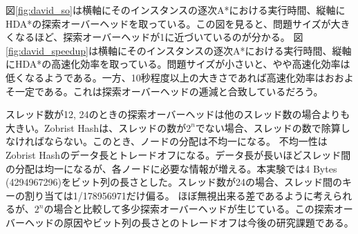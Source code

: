 \documentclass[uplatex]{jsarticle}
\begin{document}
図\ref{fig:david_so}は横軸にそのインスタンスの逐次A*における実行時間、縦軸にHDA*の探索オーバーヘッドを取っている。この図を見ると、問題サイズが大きくなるほど、探索オーバーヘッドが1に近づいているのが分かる。
図\ref{fig:david_speedup}は横軸にそのインスタンスの逐次A*における実行時間、縦軸にHDA*の高速化効率を取っている。問題サイズが小さいと、やや高速化効率は低くなるようである。一方、10秒程度以上の大きさであれば高速化効率はおおよそ一定である。これは探索オーバーヘッドの逓減と合致しているだろう。


スレッド数が12, 24のときの探索オーバーヘッドは他のスレッド数の場合よりも大きい。Zobrist Hashは、スレッドの数が$2^n$でない場合、スレッドの数で除算しなければならない。このとき、ノードの分配は不均一になる。%
不均一性はZobrist Hashのデータ長とトレードオフになる。データ長が長いほどスレッド間の分配は均一になるが、各ノードに必要な情報が増える。本実験では4 Bytes (4294967296)をビット列の長さとした。スレッド数が24の場合、スレッド間のキーの割り当ては1/178956971だけ偏る。%
ほぼ無視出来る差であるように考えられるが、$2^n$の場合と比較して多少探索オーバーヘッドが生じている。この探索オーバーヘッドの原因やビット列の長さとのトレードオフは今後の研究課題である。
\newline
\end{document}

